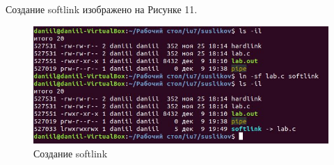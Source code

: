 \documentclass[14pt, a4paper]{extarticle}
\begin{document}
	Создание softlink изображено на Рисунке 11.
	\begin{figure}[h]
		\centering
		\includegraphics[scale=1]{source/9}
		\caption{Создание softlink }
	\end{figure}
\end{document}
